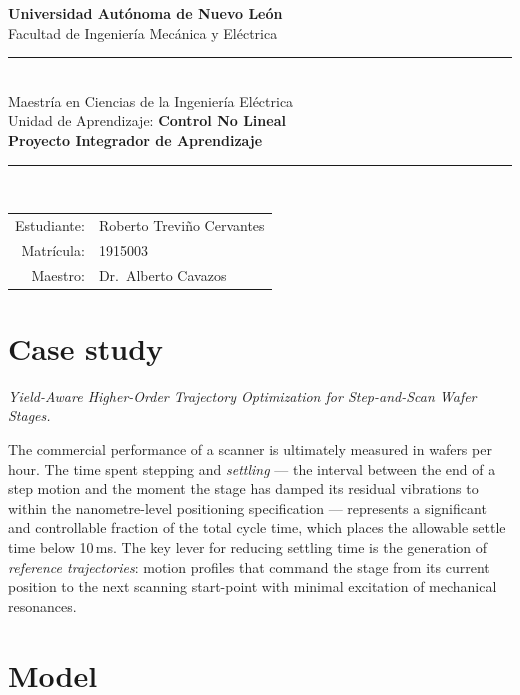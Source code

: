 \documentclass[11pt,letterpaper]{article}
\begin{document}
\thispagestyle{empty}
\begin{center}
  {\bfseries Universidad Autónoma de Nuevo León}\\
  Facultad de Ingeniería Mecánica y Eléctrica\\[0.6em]
  \textcolor{uanlBlue}{\rule{\linewidth}{1pt}}\\[0.6em]
  Maestría en Ciencias de la Ingeniería Eléctrica\\
  Unidad de Aprendizaje: \textbf{Control No Lineal}\\[1.2em]
  {\LARGE\bfseries Proyecto Integrador de Aprendizaje}\\[1em]
  \textcolor{uanlBlue}{\rule{0.6\linewidth}{0.4pt}}\\[1em]
  \begin{tabular}{rl}
    Estudiante: & Roberto Treviño Cervantes \\
    Matrícula:  & 1915003 \\
    Maestro:    & Dr.\ Alberto Cavazos \\
  \end{tabular}
\end{center}

\vfill
\newpage
\setcounter{page}{1}


\section*{Case study}

\textit{Yield-Aware Higher-Order Trajectory Optimization for Step-and-Scan Wafer Stages.}

The commercial performance of a scanner is ultimately measured in wafers per hour. The time spent stepping and \textit{settling} --- the interval between the end of a step motion and the moment the stage has damped its residual vibrations to within the nanometre-level positioning specification --- represents a significant and controllable fraction of the total cycle time, which places the allowable settle time below 10\,ms. The key lever for reducing settling time is the generation of \textit{reference trajectories}: motion profiles that command the stage from its current position to the next scanning start-point with minimal excitation of mechanical resonances.

\section*{Model}
\end{document}
